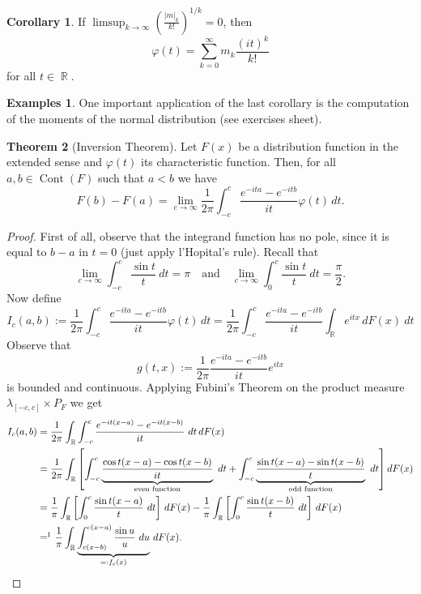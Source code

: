 \documentclass[12pt,a4paper]{report}
\theoremstyle{definition}
\newtheorem{theorem}{Theorem}[chapter] %
\newtheorem{corollary}[theorem]{Corollary} %
\newtheorem*{examples}{Examples}
\theoremstyle{num.custom-title}
\DeclareMathOperator{\R}{\mathbb{R}}
\DeclareMathOperator{\Cont}{Cont}
\renewcommand{\phi}{\varphi}
\renewcommand{\1}{\mathbbm{1}}
\begin{document}
\begin{corollary}
If $\limsup_{k \to \infty} \left( \frac{|m|_k}{k!} \right)^{1/k} = 0$, then
\[
\phi(t) = \sum_{k=0}^\infty m_k \frac{(it)^k}{k!}
\]
for all $t \in \R$.
\end{corollary}

\begin{examples}
One important application of the last corollary is the computation of the moments of the normal distribution (see exercises sheet).
\end{examples}

\begin{theorem}[Inversion Theorem]
Let $F(x)$ be a distribution function in the extended sense and $\phi(t)$ its characteristic function. Then, for all $a,b \in \Cont(F)$ such that $a<b$ we have
\[
F(b) - F(a) = \lim_{c \to \infty} \frac{1}{2\pi} \int_{-c}^c \frac{e^{-ita} - e^{-itb}}{it} \phi(t) \, dt.
\]
\begin{proof}
First of all, observe that the integrand function has no pole, since it is equal to $b-a$ in $t=0$ (just apply l'Hopital's rule). Recall that
\[
\lim_{c \to \infty} \int_{-c}^c \frac{\sin t}{t} \ dt = \pi \quad \text{and} \quad \lim_{c \to \infty} \int_0^c \frac{\sin t}{t} \ dt = \frac{\pi}{2}.
\]
Now define
\[
I_c(a,b) := \frac{1}{2\pi} \int_{-c}^c \frac{e^{-ita} - e^{-itb}}{it} \phi(t) \, dt = \frac{1}{2\pi} \int_{-c}^c \frac{e^{-ita} - e^{-itb}}{it} \int_{\R} e^{itx} \, dF(x) \ dt
\]
Observe that 
\[
g(t,x) := \frac{1}{2\pi} \frac{e^{-ita} - e^{-itb}}{it} e^{itx}
\]
is bounded and continuous. Applying Fubini's Theorem on the product measure $\lambda_{[-c,c]} \times P_F$ we get
\begin{align*}
I_c(a,b) 
&= \frac{1}{2\pi} \int_{\R} \int_{-c}^c \frac{e^{-it(x-a)} - e^{-it(x-b)}}{it} \ dt \, dF(x) \\
&= \frac{1}{2\pi} \int_{\R} \left[ \int_{-c}^c \underbrace{\frac{\cos t(x-a) - \cos t(x-b)}{it}}_{\text{even function}} \ dt + \int_{-c}^c \underbrace{\frac{\sin t(x-a) - \sin t(x-b)}{t}}_{\text{odd function}} \ dt \right] dF(x) \\
&= \frac{1}{\pi} \int_{\R} \left[ \int_0^c \frac{\sin t(x-a)}{t} \ dt \right] \, dF(x) - \frac{1}{\pi} \int_{\R} \left[ \int_0^c \frac{\sin t(x-b)}{t} \ dt \right] \, dF(x) \\
&=\!\!\footnotemark \ \frac{1}{\pi} \int_{\R} \underbrace{\int_{c(x-b)}^{c(x-a)} \frac{\sin u}{u} \ du}_{=: f_c(x)} \, dF(x).
\end{align*}

\end{proof}
\end{theorem}
\end{document}
